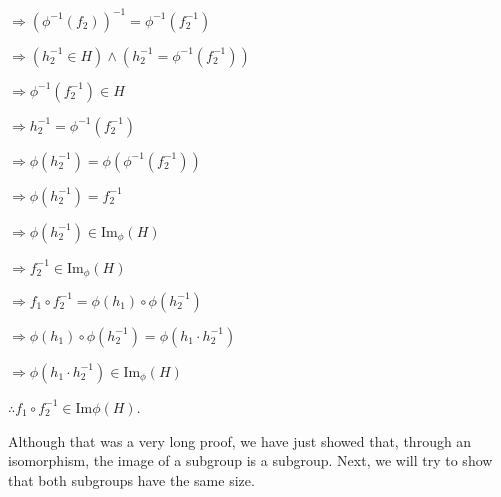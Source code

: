 \documentclass[12pt, a4paper]{article}
\begin{document}
\vspace{2mm}
\hspace{10mm} $\Rightarrow(\phi^{-1}(f_2))^{-1}=\phi^{-1}(f^{-1}_2)$\par
\vspace{2mm}
\hspace{10mm} $\Rightarrow (h^{-1}_2\in H)\wedge(h^{-1}_2=\phi^{-1}(f^{-1}_2))$\par
\vspace{2mm}
\hspace{10mm} $\Rightarrow\phi^{-1}(f^{-1}_2)\in H$\par
\vspace{2mm}
\hspace{10mm} $\Rightarrow h^{-1}_2=\phi^{-1}(f^{-1}_2)$\par
\vspace{2mm}
\hspace{10mm} $\Rightarrow\phi(h^{-1}_2)=\phi(\phi^{-1}(f^{-1}_2))$\par
\vspace{2mm}
\hspace{10mm} $\Rightarrow\phi(h^{-1}_2)=f^{-1}_2$\par
\vspace{2mm}
\hspace{10mm} $\Rightarrow\phi(h^{-1}_2)\in$Im$_{\phi}(H)$\par
\vspace{2mm}
\hspace{10mm} $\Rightarrow f^{-1}_2\in$Im$_{\phi}(H)$\par
\vspace{2mm} 
\hspace{10mm}$\Rightarrow f_1\circ f^{-1}_2=\phi(h_1)\circ\phi(h^{-1}_2)$\par
\vspace{2mm}
\hspace{10mm} $\Rightarrow\phi(h_1)\circ\phi(h^{-1}_2)=\phi(h_1\cdot h^{-1}_2)$\par
\vspace{2mm}
\hspace{10mm} $\Rightarrow\phi(h_1\cdot h^{-1}_2)\in$Im$_{\phi}(H)$\par
\vspace{2mm}
\hspace{2mm} $\therefore f_1\circ f^{-1}_2\in$Im${\phi}(H)$.\par
\vspace{4mm}

    Although that was a very long proof, we have just showed that, through an isomorphism, the image of a subgroup is a subgroup. Next, we will try to show that both subgroups have the same size. 
\end{document}
